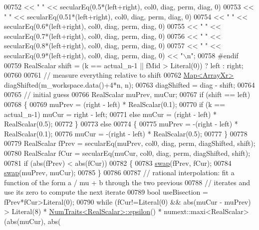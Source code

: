 \begin{DoxyCode}
00752               << \textcolor{stringliteral}{" "}       << secularEq(0.5*(left+right), col0, diag, perm, diag, 0)
00753               << \textcolor{stringliteral}{" "}       << secularEq(0.51*(left+right), col0, diag, perm, diag, 0)
00754               << \textcolor{stringliteral}{" "}       << secularEq(0.6*(left+right), col0, diag, perm, diag, 0)
00755               << \textcolor{stringliteral}{" "}       << secularEq(0.7*(left+right), col0, diag, perm, diag, 0)
00756               << \textcolor{stringliteral}{" "}       << secularEq(0.8*(left+right), col0, diag, perm, diag, 0)
00757               << \textcolor{stringliteral}{" "}       << secularEq(0.9*(left+right), col0, diag, perm, diag, 0) << \textcolor{stringliteral}{"\(\backslash\)n"};
00758 \textcolor{preprocessor}{#endif}
00759     RealScalar shift = (k == actual\_n-1 || fMid > Literal(0)) ? left : right;
00760     
00761     \textcolor{comment}{// measure everything relative to shift}
00762     \hyperlink{group___core___module_class_eigen_1_1_map}{Map<ArrayXr>} diagShifted(m\_workspace.data()+4*n, n);
00763     diagShifted = diag - shift;
00764     
00765     \textcolor{comment}{// initial guess}
00766     RealScalar muPrev, muCur;
00767     \textcolor{keywordflow}{if} (shift == left)
00768     \{
00769       muPrev = (right - left) * RealScalar(0.1);
00770       \textcolor{keywordflow}{if} (k == actual\_n-1) muCur = right - left;
00771       \textcolor{keywordflow}{else}                 muCur = (right - left) * RealScalar(0.5);
00772     \}
00773     \textcolor{keywordflow}{else}
00774     \{
00775       muPrev = -(right - left) * RealScalar(0.1);
00776       muCur = -(right - left) * RealScalar(0.5);
00777     \}
00778 
00779     RealScalar fPrev = secularEq(muPrev, col0, diag, perm, diagShifted, shift);
00780     RealScalar fCur = secularEq(muCur, col0, diag, perm, diagShifted, shift);
00781     \textcolor{keywordflow}{if} (abs(fPrev) < abs(fCur))
00782     \{
00783       \hyperlink{endian_8c_a3ca5ecd34b04d6a243c054ac3a57f68d}{swap}(fPrev, fCur);
00784       \hyperlink{endian_8c_a3ca5ecd34b04d6a243c054ac3a57f68d}{swap}(muPrev, muCur);
00785     \}
00786 
00787     \textcolor{comment}{// rational interpolation: fit a function of the form a / mu + b through the two previous}
00788     \textcolor{comment}{// iterates and use its zero to compute the next iterate}
00789     \textcolor{keywordtype}{bool} useBisection = fPrev*fCur>Literal(0);
00790     \textcolor{keywordflow}{while} (fCur!=Literal(0) && abs(muCur - muPrev) > Literal(8) * 
      \hyperlink{group___core___module_struct_eigen_1_1_num_traits}{NumTraits<RealScalar>::epsilon}() * numext::maxi<RealScalar>(abs(muCur), abs(

\end{DoxyCode}
